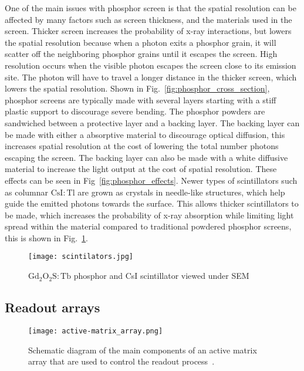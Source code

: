 One of the main issues with phosphor screen is that the spatial resolution can be affected by many factors such as screen thickness, and the materials used in the screen.  Thicker screen increases the probability of x-ray interactions, but lowers the spatial resolution because when a photon exits a phosphor grain, it will scatter off the neighboring phosphor grains until it escapes the screen.  High resolution occurs when the visible photon escapes the screen close to its emission site.  The photon will have to travel a longer distance in the thicker screen, which lowers the spatial resolution.  Shown in Fig.~\ref{fig:phosphor_cross_section}, phosphor screens are typically made with several layers starting with a stiff plastic support to discourage severe bending.  The phosphor powders are sandwiched between a protective layer and a backing layer.  The backing layer can be made with either a absorptive material to discourage optical diffusion, this increases spatial resolution at the cost of lowering the total number photons escaping the screen.  The backing layer can also be made with a white diffusive material to increase the light output at the cost of spatial resolution.  These effects can be seen in Fig~\ref{fig:phosphor_effects}.  Newer types of scintillators such as columnar $\mathrm{CsI:Tl}$ are grown as crystals in needle-like structures, which help guide the emitted photons towards the surface.  This allows thicker scintillators to be made, which increases the probability of x-ray absorption while limiting light spread within the material compared to traditional powdered phosphor screens, this is shown in Fig.~\ref{fig:scintillators}.

\begin{figure}[h]
\texttt{[image: scintilators.jpg]}
\caption{$\mathrm{Gd_2O_2S:Tb}$ phosphor and CsI scintillator viewed under SEM~\citep{scintillatorImage}}
\label{fig:scintillators}
\end{figure}

\subsection{Readout arrays}

\begin{figure}[h]
\texttt{[image: active-matrix\_array.png]}
\caption{Schematic diagram of the main components of an active matrix array that are used to control the readout process~\citep{Fahrig2008}.}
\label{fig:schematic_active-matrix_array}
\end{figure}

